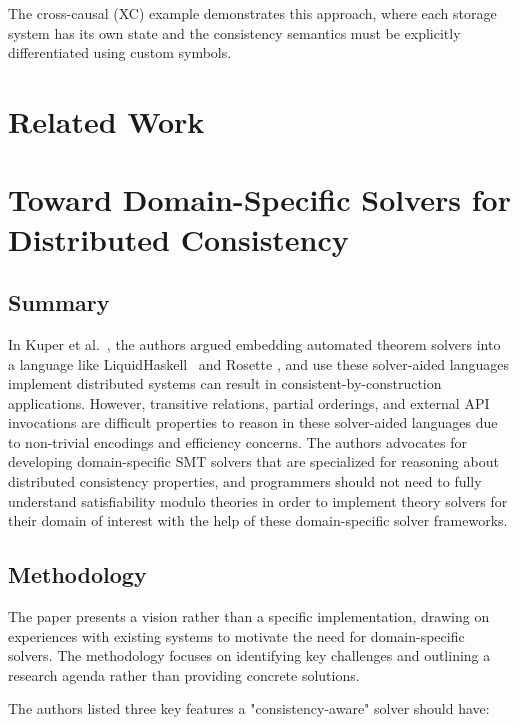 The cross-causal (XC) example demonstrates this approach, where each
storage system has its own state and the consistency semantics must
be explicitly differentiated using custom symbols.

\section{Related Work}

{\color{red}

  \section{Toward Domain-Specific Solvers for Distributed Consistency}

  \subsection{Summary}

  In Kuper et al.~\cite{kuper2019toward}, the authors argued
  embedding automated theorem
  solvers into a language like
  LiquidHaskell~\cite{vazou2014liquidhaskell} and Rosette
  \cite{torlak2014a}, and use these solver-aided languages implement
  distributed systems
  can result in consistent-by-construction applications. However, transitive
  relations, partial orderings, and external API invocations are difficult
  properties to reason in these solver-aided languages due to non-trivial
  encodings and efficiency concerns. The authors advocates for developing
  domain-specific SMT solvers that are specialized for reasoning
  about distributed
  consistency properties, and programmers should not need to fully understand
  satisfiability modulo theories in order to implement theory solvers for their
  domain of interest with the help of these domain-specific solver frameworks.

  \subsection{Methodology}

  The paper presents a vision rather than a specific implementation, drawing on
  experiences with existing systems to motivate the need for domain-specific
  solvers. The methodology focuses on identifying key challenges and outlining a
  research agenda rather than providing concrete solutions.

  The authors listed three key features a "consistency-aware" solver
  should have:

}

